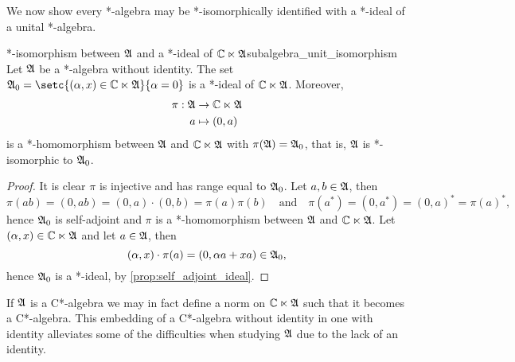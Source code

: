 We now show every *-algebra may be *-isomorphically identified with a *-ideal of a unital *-algebra.
\begin{lemma}{*-isomorphism between \(\mathfrak{A}\) and a *-ideal of \(\mathbb{C} \ltimes \mathfrak{A}\)}{subalgebra_unit_isomorphism}
    Let \(\mathfrak{A}\) be a *-algebra without identity. The set \(\algebra{A}_0 = \setc{(\alpha, x) \in \mathbb{C} \ltimes \algebra{A}}{\alpha = 0}\) is a *-ideal of \(\mathbb{C} \ltimes \mathfrak{A}\). Moreover,
    \begin{align*}
        \pi : \mathfrak{A} &\to \mathbb{C} \ltimes \mathfrak{A}\\
                        a &\mapsto (0, a)
    \end{align*}
    is a *-homomorphism between \(\mathfrak{A}\) and \(\mathbb{C} \ltimes \mathfrak{A}\) with \(\pi(\mathfrak{A}) = \mathfrak{A}_0\), that is, \(\mathfrak{A}\) is *-isomorphic to \(\mathfrak{A}_0\).
\end{lemma}
\begin{proof}
    It is clear \(\pi\) is injective and has range equal to \(\mathfrak{A}_0\). Let \(a, b \in \mathfrak{A}\), then
    \begin{equation*}
        \pi(ab) = (0,ab) = (0, a) \cdot (0, b) = \pi(a) \pi(b)
        \quad\text{and}\quad
        \pi(a^*) = (0, a^*) = (0, a)^* = \pi(a)^*,
    \end{equation*}
    hence \(\mathfrak{A}_0\) is self-adjoint and \(\pi\) is a *-homomorphism between \(\mathfrak{A}\) and \(\mathbb{C} \ltimes \mathfrak{A}\). Let \((\alpha, x) \in \mathbb{C}\ltimes \mathfrak{A}\) and let \(a \in \mathfrak{A}\), then
    \begin{equation*}
        (\alpha, x)\cdot \pi(a) = (0, \alpha a + xa) \in \mathfrak{A}_0,
    \end{equation*}
    hence \(\mathfrak{A}_0\) is a *-ideal, by \cref{prop:self_adjoint_ideal}.
\end{proof}

If \(\mathfrak{A}\) is a C*-algebra we may in fact define a norm on \(\mathbb{C} \ltimes \mathfrak{A}\) such that it becomes a C*-algebra. This embedding of a C*-algebra without identity in one with identity alleviates some of the difficulties when studying \(\mathfrak{A}\) due to the lack of an identity.

